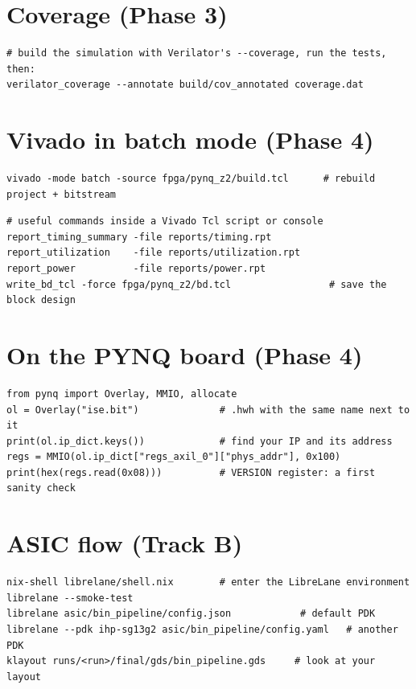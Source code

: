 \section*{Coverage (Phase 3)}
\begin{lstlisting}[style=shell]
# build the simulation with Verilator's --coverage, run the tests, then:
verilator_coverage --annotate build/cov_annotated coverage.dat
\end{lstlisting}

\section*{Vivado in batch mode (Phase 4)}
\begin{lstlisting}[style=shell]
vivado -mode batch -source fpga/pynq_z2/build.tcl      # rebuild project + bitstream
\end{lstlisting}
\begin{lstlisting}[style=tcl]
# useful commands inside a Vivado Tcl script or console
report_timing_summary -file reports/timing.rpt
report_utilization    -file reports/utilization.rpt
report_power          -file reports/power.rpt
write_bd_tcl -force fpga/pynq_z2/bd.tcl                 # save the block design
\end{lstlisting}

\section*{On the PYNQ board (Phase 4)}
\begin{lstlisting}[style=py]
from pynq import Overlay, MMIO, allocate
ol = Overlay("ise.bit")              # .hwh with the same name next to it
print(ol.ip_dict.keys())             # find your IP and its address
regs = MMIO(ol.ip_dict["regs_axil_0"]["phys_addr"], 0x100)
print(hex(regs.read(0x08)))          # VERSION register: a first sanity check
\end{lstlisting}

\section*{ASIC flow (Track B)}
\begin{lstlisting}[style=shell]
nix-shell librelane/shell.nix        # enter the LibreLane environment
librelane --smoke-test
librelane asic/bin_pipeline/config.json            # default PDK
librelane --pdk ihp-sg13g2 asic/bin_pipeline/config.yaml   # another PDK
klayout runs/<run>/final/gds/bin_pipeline.gds     # look at your layout
\end{lstlisting}

